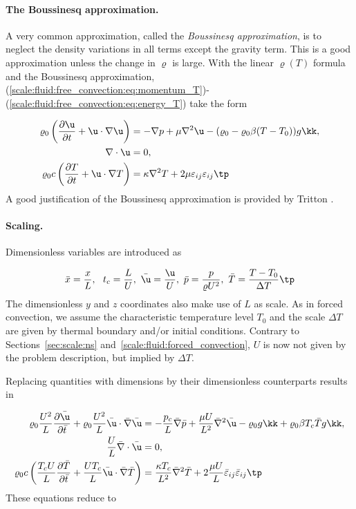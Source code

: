 \documentclass[graybox,envcountchap,sectrefs,final]{svmonodo}
\begin{document}
\paragraph{The Boussinesq approximation.}
A very common approximation, called the \emph{Boussinesq approximation}, is
to neglect the density variations in all terms except the gravity term.
This is a good approximation unless the change in $\varrho$ is large.
With the linear $\varrho(T)$ formula and the Boussinesq approximation,
(\ref{scale:fluid:free_convection:eq:momentum_T})-(\ref{scale:fluid:free_convection:eq:energy_T})
take the form

\begin{align}
\varrho_0\left(\frac{\partial \u}{\partial t} + \u\cdot\nabla\u\right)
&= -\nabla p + \mu\nabla^2\u - (\varrho_0 - \varrho_0\beta(T-T_0))g\kk,
\label{scale:fluid:free_convection:eq:momentum_TB}\\ 
\nabla\cdot\u & = 0,
\label{scale:fluid:free_convection:eq:cont_TB}\\ 
\varrho_0 c\left(\frac{\partial T}{\partial t} + \u\cdot\nabla T\right)
&= \kappa\nabla^2 T + 2\mu\varepsilon_{ij}\varepsilon_{ij}\tp
\label{scale:fluid:free_convection:eq:energy_TB}
\end{align}
A good justification of the Boussinesq approximation is provided
by Tritton \cite[Ch.~13]{Tritton}.

\paragraph{Scaling.}
Dimensionless variables are introduced as

\[ \bar x = \frac{x}{L},\ \ t_c = \frac{L}{U},\ 
\bar\u = \frac{\u}{U},\ \bar p = \frac{p}{\varrho U^2},\ 
\bar T = \frac{T-T_0}{\Delta T}\tp\]
The dimensionless $y$ and $z$ coordinates also make use of $L$ as scale.
As in forced convection, we assume the characteristic temperature
level $T_0$ and the scale $\Delta T$ are given by thermal boundary and/or
initial conditions.
Contrary to Sections~\ref{sec:scale:ns} and~\ref{scale:fluid:forced_convection},
$U$ is now not given by the problem description, but implied by
$\Delta T$.

Replacing quantities with dimensions by their dimensionless counterparts
results in

\begin{align*}
\varrho_0\frac{U^2}{L}\frac{\partial \bar\u}{\partial \bar t} +
\varrho_0\frac{U^2}{L}\bar \u\cdot\bar \nabla\bar\u
&= -\frac{p_c}{L}\bar\nabla \bar p + \frac{\mu U}{L^2}
\bar \nabla^2\bar \u - \varrho_0g\kk + \varrho_0\beta T_c\bar T g\kk,
\\ 
\frac{U}{L}\bar\nabla\cdot\bar\u & = 0,
\\ 
\varrho_0 c\left(\frac{T_c U}{L}
\frac{\partial \bar T}{\partial \bar t} +
\frac{UT_c}{L}\bar\u\cdot\bar\nabla \bar T\right)
&= \frac{\kappa T_c}{L^2}
\bar \nabla^2 \bar T + 2\frac{\mu U}{L}
\bar\varepsilon_{ij}\bar\varepsilon_{ij}\tp
\end{align*}
These equations reduce to
\end{document}
